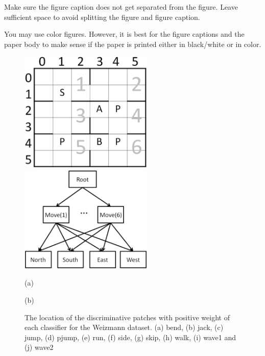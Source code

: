 \documentclass{article} %
\begin{document}
Make sure the figure caption does not get separated from the figure.
Leave sufficient space to avoid splitting the figure and figure caption.

You may use color figures. 
However, it is best for the
figure captions and the paper body to make sense if the paper is printed
either in black/white or in color.
\begin{figure}[h]
 \begin{minipage}[b]{0.5\linewidth}
    \includegraphics[width=2.5in] {BusSmall.eps}
\end{minipage}
\begin{minipage}[b]{0.5\linewidth}
    \includegraphics[width=2.5in] {BusHierarchy.eps}
\end{minipage}
\begin{minipage}[b]{0.5\linewidth} \centering (a) \end{minipage}
\begin{minipage}[b]{0.5\linewidth} \centering (b) \end{minipage}

\caption{The location of the discriminative patches with positive weight of each classifier for the Weizmann dataset. (a) bend, (b) jack,
(c) jump, (d) pjump, (e) run, (f) side, (g) skip, (h) walk, (i) wave1 and (j) wave2}
\label{fig:bus}
\end{figure}
\end{document}
